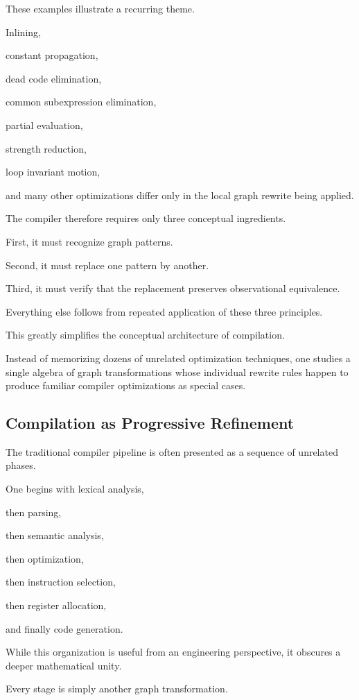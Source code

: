 \documentclass[12pt,oneside]{article}
\begin{document}
These examples illustrate a recurring theme.

Inlining,

constant propagation,

dead code elimination,

common subexpression elimination,

partial evaluation,

strength reduction,

loop invariant motion,

and many other optimizations differ only in the local graph rewrite being applied.

The compiler therefore requires only three conceptual ingredients.

First, it must recognize graph patterns.

Second, it must replace one pattern by another.

Third, it must verify that the replacement preserves observational equivalence.

Everything else follows from repeated application of these three principles.

This greatly simplifies the conceptual architecture of compilation.

Instead of memorizing dozens of unrelated optimization techniques, one studies a single algebra of graph transformations whose individual rewrite rules happen to produce familiar compiler optimizations as special cases.

\subsection{Compilation as Progressive Refinement}

The traditional compiler pipeline is often presented as a sequence of unrelated phases.

One begins with lexical analysis,

then parsing,

then semantic analysis,

then optimization,

then instruction selection,

then register allocation,

and finally code generation.

While this organization is useful from an engineering perspective, it obscures a deeper mathematical unity.

Every stage is simply another graph transformation.
\end{document}
